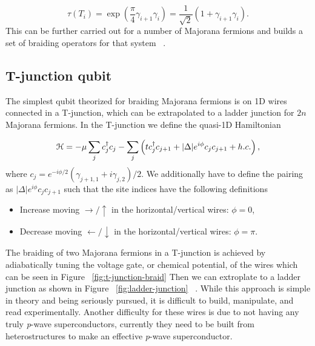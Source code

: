 \begin{equation}
  \tau(T_i) = \exp\left(\dfrac{\pi}{4} \gamma_{i+1} \gamma_i\right) = \dfrac{1}{\sqrt{2}} \left(1+ \gamma_{i+1} \gamma_i\right).
\end{equation}
This can be further carried out for a number of Majorana fermions and builds a set of braiding operators for that system ~\cite{ivanovNonAbelianStatisticsHalfQuantum2001}.

\subsection{T-junction qubit}
The simplest qubit theorized for braiding Majorana fermions is on 1D wires connected in a T-junction, which can be extrapolated to a ladder junction for $2n$ Majorana fermions.
In the T-junction we define the quasi-1D Hamiltonian

\begin{equation}
  \mathcal{H} = -\mu \sum_j c^{\dagger}_j c_j - \sum_j \left(tc^{\dagger}_j c_{j+1} + |\Delta|e^{i\phi} c_j c_{j+1} + h.c. \right),
\end{equation}
where
$c_j = e^{-i\phi/2} (\gamma_{j+1,1} + i \gamma_{j,2})/2$.
We additionally have to define the pairing as
$|\Delta|e^{i\phi} c_j c_{j+1}$
such that the site indices have the following definitions
\begin{itemize}
  \item Increase moving $\rightarrow / \uparrow$ in the horizontal/vertical wires: $\phi = 0$,
  \item Decrease moving $\leftarrow / \downarrow$ in the horizontal/vertical wires: $\phi = \pi$.
\end{itemize}
The braiding of two Majorana fermions in a T-junction is achieved by adiabatically tuning the voltage gate, or chemical potential, of the wires which can be seen in Figure ~\ref{fig:t-junction-braid}
Then we can extroplate to a ladder junction as shown in Figure ~\ref{fig:ladder-junction} ~\cite{aliceaNonAbelianStatisticsTopological2011}.
While this approach is simple in theory and being seriously pursued, it is difficult to build, manipulate, and read experimentally.
Another difficulty for these wires is due to not having any truly \textit{p}-wave superconductors, currently they need to be built from heterostructures to make an effective \textit{p}-wave superconductor.

